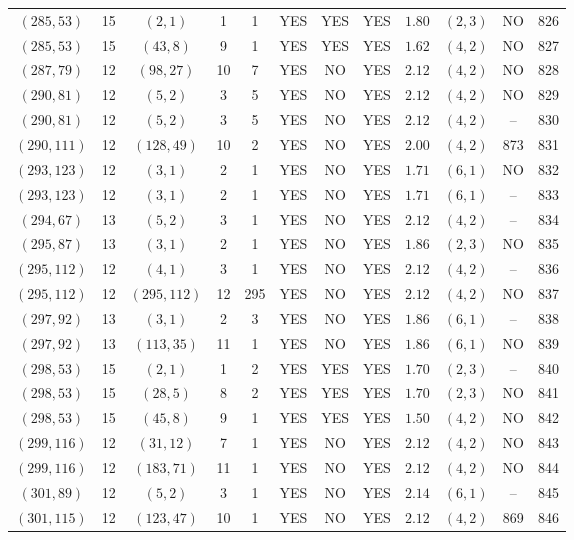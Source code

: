 \begin{longtable}{|c|c|c|c|c|c|c|c|c|c|c|c|}
$(285,53)$ & 15 & $(2,1)$ & 1 & 1 & YES & YES & YES & $1.80$ & $(2,3)$ & NO & 826\\
$(285,53)$ & 15 & $(43,8)$ & 9 & 1 & YES & YES & YES & $1.62$ & $(4,2)$ & NO & 827\\
$(287,79)$ & 12 & $(98,27)$ & 10 & 7 & YES & NO & YES & $2.12$ & $(4,2)$ & NO & 828\\
$(290,81)$ & 12 & $(5,2)$ & 3 & 5 & YES & NO & YES & $2.12$ & $(4,2)$ & NO & 829\\
$(290,81)$ & 12 & $(5,2)$ & 3 & 5 & YES & NO & YES & $2.12$ & $(4,2)$ & -- & 830\\
$(290,111)$ & 12 & $(128,49)$ & 10 & 2 & YES & NO & YES & $2.00$ & $(4,2)$ & 873 & 831\\
$(293,123)$ & 12 & $(3,1)$ & 2 & 1 & YES & NO & YES & $1.71$ & $(6,1)$ & NO & 832\\
$(293,123)$ & 12 & $(3,1)$ & 2 & 1 & YES & NO & YES & $1.71$ & $(6,1)$ & -- & 833\\
$(294,67)$ & 13 & $(5,2)$ & 3 & 1 & YES & NO & YES & $2.12$ & $(4,2)$ & -- & 834\\
$(295,87)$ & 13 & $(3,1)$ & 2 & 1 & YES & NO & YES & $1.86$ & $(2,3)$ & NO & 835\\
$(295,112)$ & 12 & $(4,1)$ & 3 & 1 & YES & NO & YES & $2.12$ & $(4,2)$ & -- & 836\\
$(295,112)$ & 12 & $(295,112)$ & 12 & 295 & YES & NO & YES & $2.12$ & $(4,2)$ & NO & 837\\
$(297,92)$ & 13 & $(3,1)$ & 2 & 3 & YES & NO & YES & $1.86$ & $(6,1)$ & -- & 838\\
$(297,92)$ & 13 & $(113,35)$ & 11 & 1 & YES & NO & YES & $1.86$ & $(6,1)$ & NO & 839\\
$(298,53)$ & 15 & $(2,1)$ & 1 & 2 & YES & YES & YES & $1.70$ & $(2,3)$ & -- & 840\\
$(298,53)$ & 15 & $(28,5)$ & 8 & 2 & YES & YES & YES & $1.70$ & $(2,3)$ & NO & 841\\
$(298,53)$ & 15 & $(45,8)$ & 9 & 1 & YES & YES & YES & $1.50$ & $(4,2)$ & NO & 842\\
$(299,116)$ & 12 & $(31,12)$ & 7 & 1 & YES & NO & YES & $2.12$ & $(4,2)$ & NO & 843\\
$(299,116)$ & 12 & $(183,71)$ & 11 & 1 & YES & NO & YES & $2.12$ & $(4,2)$ & NO & 844\\
$(301,89)$ & 12 & $(5,2)$ & 3 & 1 & YES & NO & YES & $2.14$ & $(6,1)$ & -- & 845\\
$(301,115)$ & 12 & $(123,47)$ & 10 & 1 & YES & NO & YES & $2.12$ & $(4,2)$ & 869 & 846\\

\end{longtable}
